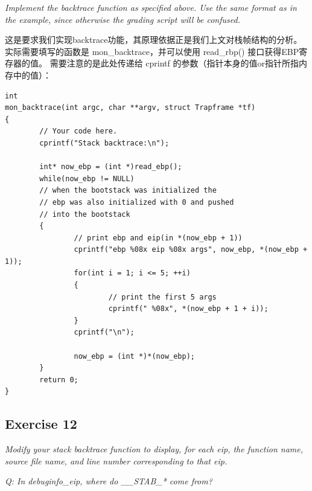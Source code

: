 \documentclass[12pt, letterpaper]{report}
\begin{document}
\textsl{Implement the backtrace function as specified above. 
        Use the same format as in the example, since otherwise the grading script will be confused.} \par
\quad \par 
这是要求我们实现backtrace功能，其原理依据正是我们上文对栈帧结构的分析。
实际需要填写的函数是 mon\_backtrace，并可以使用 read\_rbp() 接口获得EBP寄存器的值。
需要注意的是此处传递给 cprintf 的参数（指针本身的值or指针所指内存中的值）：\par 
\lstset{style=CStyle}
\setmainfont{Consolas}
\begin{lstlisting}
int
mon_backtrace(int argc, char **argv, struct Trapframe *tf)
{
        // Your code here.
        cprintf("Stack backtrace:\n");

        int* now_ebp = (int *)read_ebp();
        while(now_ebp != NULL)
        // when the bootstack was initialized the 
        // ebp was also initialized with 0 and pushed
        // into the bootstack
        {
                // print ebp and eip(in *(now_ebp + 1))
                cprintf("ebp %08x eip %08x args", now_ebp, *(now_ebp + 1));
                for(int i = 1; i <= 5; ++i)
                {
                        // print the first 5 args
                        cprintf(" %08x", *(now_ebp + 1 + i));
                }
                cprintf("\n");

                now_ebp = (int *)*(now_ebp);
        }
        return 0;
}
\end{lstlisting}
\setmainfont{Times New Roman}
\quad \par 



\newpage
\subsection{\large Exercise 12}
\textsl{Modify your stack backtrace function to display, 
        for each eip, the function name, source file name, 
        and line number corresponding to that eip.} \par
\textsl{Q: In debuginfo\_eip, where do \_\_STAB\_* come from?} \par 
\end{document}
